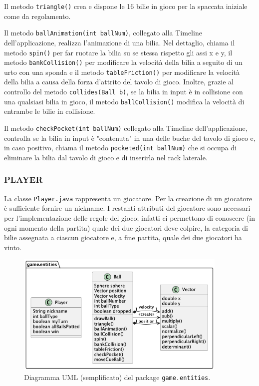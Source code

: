 \documentclass[12pt,a4paper]{report}
\begin{document}
Il metodo \texttt{triangle()} crea e dispone le 16 bilie in gioco per la spaccata iniziale come da regolamento.

\vspace{3mm}

Il metodo \texttt{ballAnimation(int ballNum)}, collegato alla Timeline dell'applicazione, realizza l'animazione di una bilia.
Nel dettaglio, chiama il metodo \texttt{spin()} per far ruotare la bilia su se stessa rispetto gli assi x e y, il metodo \texttt{bankCollision()} per modificare la velocità della bilia a seguito di un urto con una sponda e il metodo \texttt{tableFriction()} per modificare la velocità della bilia a causa della forza d'attrito del tavolo di gioco.
Inoltre, grazie al controllo del metodo \texttt{collides(Ball b)}, se la bilia in input è in collisione con una qualsiasi bilia in gioco, il metodo \texttt{ballCollision()} modifica la velocità di entrambe le bilie in collisione.

\vspace{3mm}

Il metodo \texttt{checkPocket(int ballNum)} collegato alla Timeline dell'applicazione, controlla se la bilia in input è "contenuta" in una delle buche del tavolo di gioco e, in caso positivo, chiama il metodo \texttt{pocketed(int ballNum)} che si occupa di eliminare la bilia dal tavolo di gioco e di inserirla nel rack laterale.

\subsubsection*{PLAYER}
La classe \texttt{Player.java} rappresenta un giocatore.
Per la creazione di un giocatore è sufficiente fornire un nickname.
I restanti attributi del giocatore sono necessari per l'implementazione delle regole del gioco; infatti ci permettono di conoscere (in ogni momento della partita) quale dei due giocatori deve colpire, la categoria di bilie assegnata a ciascun giocatore e, a fine partita, quale dei due giocatori ha vinto.

\begin{figure}
	\center
	\includegraphics[width=0.9\textwidth]{entities.png}
	\caption{Diagramma UML (semplificato) del package \texttt{game.entities}.}
\end{figure}
\end{document}
